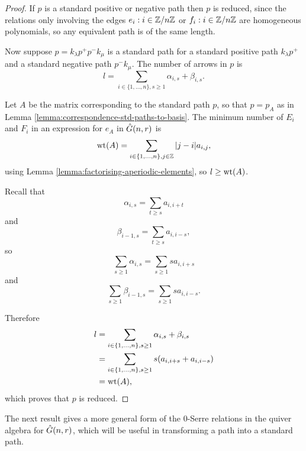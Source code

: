 \documentclass[a4paper, 11pt, twoside]{report}
\begin{document}
\begin{proof}
If $p$ is a standard positive or negative path then $p$ is reduced, since the relations only involving the edges $e_i:i\in\mathbb{Z}/{n \mathbb{Z}}$ or $f_i:i\in\mathbb{Z}/{n \mathbb{Z}}$ are homogeneous polynomials, so any equivalent path is of the same length.

Now suppose $p=k_\lambda p^+p^- k_\mu$ is a standard path for a standard positive path $k_\lambda p^+$ and a standard negative path $p^- k_\mu$. The number of arrows in $p$ is
\begin{equation*}
l=\sum_{i\in\{1,\ldots,n\},s\geq 1} \alpha_{i,s} + \beta_{i,s}.
\end{equation*}

Let $A$ be the matrix corresponding to the standard path $p$, so that $p=p_A$ as in Lemma \ref{lemma:correspondence-std-paths-to-basis}. The minimum number of $E_i$ and $F_i$ in an expression for $e_A$ in $\hat{G}(n,r)$ is
\begin{equation*}
\operatorname{wt}(A) = \sum_{i\in\{1,\ldots,n\},j\in\mathbb{Z}} |j-i|a_{i,j},
\end{equation*}
using Lemma \ref{lemma:factorising-aperiodic-elements}, so $l\geq \operatorname{wt}(A)$.

Recall that
\begin{equation*}
\alpha_{i,s} = \sum_{t\geq s} a_{i,i+t}
\end{equation*}
and
\begin{equation*}
\beta_{i-1,s} = \sum_{t\geq s} a_{i,i-s},
\end{equation*}
so
\begin{equation*}
\sum_{s\geq 1} \alpha_{i,s} = \sum_{s\geq 1} sa_{i,i+s}
\end{equation*}
and
\begin{equation*}
\sum_{s\geq 1} \beta_{i-1,s} = \sum_{s\geq 1} sa_{i,i-s}.
\end{equation*}

Therefore
\begin{align*}
l &= \sum_{i\in\{1,\ldots,n\},s\geq 1} \alpha_{i,s} + \beta_{i,s}\\
&= \sum_{i\in\{1,\ldots,n\},s\geq 1} s(a_{i,i+s} + a_{i,i-s})\\
&= \operatorname{wt}(A),
\end{align*}
which proves that $p$ is reduced.
\end{proof}

The next result gives a more general form of the $0$-Serre relations in the quiver algebra for $\hat{G}(n,r)$, which will be useful in transforming a path into a standard path.
\end{document}
